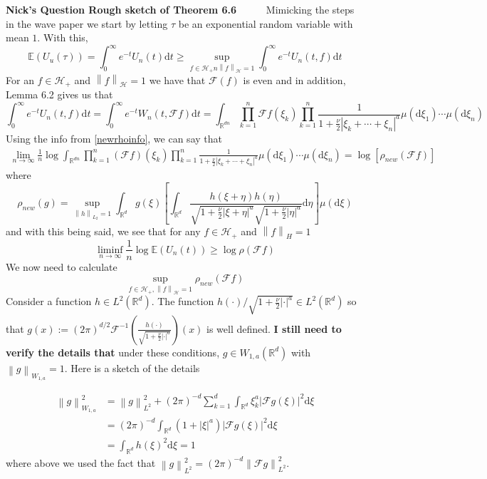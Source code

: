 \documentclass[a4paper,11pt]{article}
\numberwithin{equation}{section}
\theoremstyle{plain}
\theoremstyle{definition}
\newcommand{\ud}{\ensuremath{\mathrm{d} }}
\newcommand{\Norm}[1]{\left\|  #1   \right\|}
\newcommand{\R}{\mathbb{R}}
\newcounter{NQ}
\newenvironment{NickQuestion}[1][] %
{\refstepcounter{NQ}
	\begin{mdframed}[backgroundcolor=lightgray]\textbf{Nick's Question \theNQ \: #1~~}~~~\noindent}%
	{\end{mdframed}}
\numberwithin{NQ}{section}
\numberwithin{LQ}{section}
\numberwithin{ZQ}{section}
\begin{document}
	\begin{NickQuestion}[Rough sketch of Theorem 6.6]
		Mimicking the steps in the wave paper we start by letting $\tau$ be an exponential random variable with mean $1$. With this,
		\[
		\mathbb{E}(U_u(\tau)) = \int_0^\infty e^{-t} U_n(t) \ud t \ge \sup_{f\in \mathcal{H_+}n \Norm{f}_\mathcal{H} =1} \int_0^\infty e^{-t} U_n(t,f) \ud t
		\]
		For an $f \in \mathcal{H}_+$ and $\Norm{f}_{\mathcal{H}}= 1$ we have that $\mathcal{F}(f)$ is even and in addition, Lemma 6.2 gives us that
		\[
		\int_0^{\infty} e^{-t} U_n(t,f) \ud t = \int_0^\infty e^{-t} W_n(t,\mathcal{F}f) \ud t = \int_{\R^{dn}} \prod_{k=1}^n \mathcal{F}f(\xi_k) \prod_{k=1}^n \frac{1}{1+ \frac{\nu}{2}|\xi_k+\cdots + \xi_n|^a} \mu(\ud \xi_1) \cdots \mu(\ud \xi_n)
		\]
		Using the info from \ref{newrhoinfo}, we can say that
		\begin{align*}
		\lim_{n\to \infty}\frac{1}{n} \log \int_{\R^{dn}} \prod_{k=1}^n(\mathcal{F}f)(\xi_k) \prod_{k=1}^n\frac{1}{1+\frac{\nu}{2}|\xi_k+\cdots+\xi_n|^a} \mu(\ud \xi_1) \cdots \mu(\ud \xi_n) = \log[ \rho_{new}(\mathcal{F}f)]
		\end{align*}
		where
		\[
		\rho_{new}(g) = \sup_{\Norm{h}_{L_2}=1} \int_{\R^d}g(\xi)\left[ \int_{\R^d} \frac{h(\xi + \eta)h(\eta)}{\sqrt{1+\frac{\nu}{2}|\xi+\eta|^a}\sqrt{1+\frac{\nu}{2}|\eta|^a}}  \ud \eta\right] \mu(\ud \xi)
		\]
		and with this being said, we see that for any $f \in \mathcal{H}_+$ and $\Norm{f}_H =1$
		\[
		\liminf_{n \to \infty} \frac{1}{n}\log \mathbb{E}(U_n(t)) \ge \log \rho(\mathcal{F}f)
		\]
		We now need to calculate
		\[
		\sup_{f \in \mathcal{H}_+, \Norm{f}_{\mathcal{H}}=1} \rho_{new}(\mathcal{F}f)
		\]
		Consider a function $h\in L^2(\R^d)$. The function $h(\cdot)/\sqrt{1+\frac{\nu}{2}|\cdot|^a} \in L^2(\R^d)$ so that $g(x) := (2\pi)^{d/2} \mathcal{F}^{-1}\left( \frac{h(\cdot)}{\sqrt{1+\frac{\nu}{2}|\cdot|^a}} \right)(x)$ is well defined. \textbf{I still need to verify the details that} under these conditions, $g \in W_{1,a}(\R^d)$ with $\Norm{g}_{W_{1,a}}=1$. Here is a sketch of the details

		\begin{align*}
		\Norm{g}_{W_{1,a}}^2 &= \Norm{g}^2_{L^2} + (2\pi)^{-d}\sum_{k=1}^d \int_{\R^d} \xi_k^a|\mathcal{F}g(\xi)|^2 \ud \xi
		\\&= (2\pi)^{-d}\int_{\R^d}(1+|\xi|^a)|\mathcal{F}g(\xi)|^2 \ud \xi
		\\&= \int_{\R^d} h(\xi)^2 \ud \xi =1
		\end{align*}
		where above we used the fact that $\Norm{g}_{L^2}^2 = (2\pi)^{-d}\Norm{\mathcal{F}g}_{L^2}^2$.


\end{NickQuestion}
\end{document}
